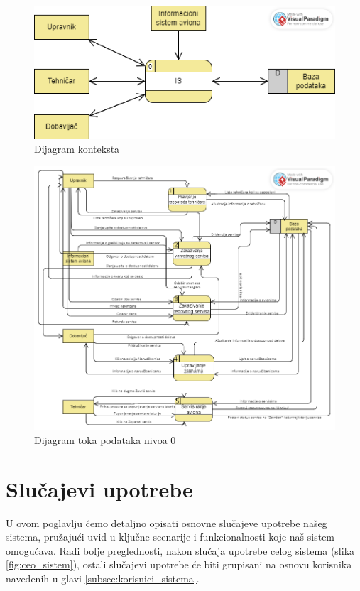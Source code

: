 \documentclass[a4paper]{article}
\begin{document}
\begin{figure}[H]
\begin{center}
\includegraphics[scale=0.55]{Dijagrami/Dijagrami_toka_podataka/DTP_dijagram_konteksta.png}
\end{center}
\caption{Dijagram konteksta}
\label{fig:dtp_dijagram_konteksta}
\end{figure}

\begin{figure}[H]
\begin{center}
\includegraphics[scale=0.7, width = 1.1\textwidth]{Dijagrami/Dijagrami_toka_podataka/DTP_nivo_0.png}
\end{center}
\caption{Dijagram toka podataka nivoa 0}
\label{fig:dtp_nivoa_0}
\end{figure}

\section{Slučajevi upotrebe}
\label{sec:sluvajevi_upotrebe}
U ovom poglavlju ćemo detaljno opisati osnovne slučajeve upotrebe našeg sistema, pružajući uvid u ključne scenarije i funkcionalnosti koje naš sistem omogućava. Radi bolje preglednosti, nakon slučaja upotrebe celog sistema (slika \ref{fig:ceo_sistem}), ostali slučajevi upotrebe će biti grupisani na osnovu korisnika navedenih u glavi \ref{subsec:korisnici_sistema}.
\end{document}
